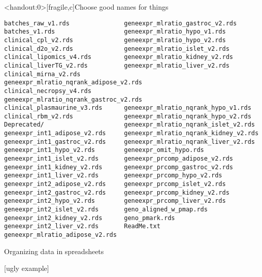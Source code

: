\documentclass[aspectratio=169,12pt,t]{beamer}
\begin{document}
\begin{frame}<handout:0>[fragile,c]{Choose good names for things}


\begin{center}
\begin{minipage}[c]{9.5cm}
\begin{semiverbatim}
\lstset{basicstyle=\tiny}
\begin{lstlisting}[escapechar=!,linewidth=9.5cm]
batches_raw_v1.rds               geneexpr_mlratio_gastroc_v2.rds
batches_v1.rds                   geneexpr_mlratio_hypo_v1.rds
clinical_cpl_v2.rds              geneexpr_mlratio_hypo_v2.rds
clinical_d2o_v2.rds              geneexpr_mlratio_islet_v2.rds
clinical_lipomics_v4.rds         geneexpr_mlratio_kidney_v2.rds
clinical_liverTG_v2.rds          geneexpr_mlratio_liver_v2.rds
clinical_mirna_v2.rds            geneexpr_mlratio_nqrank_adipose_v2.rds
clinical_necropsy_v4.rds         geneexpr_mlratio_nqrank_gastroc_v2.rds
clinical_plasmaurine_v3.rds      geneexpr_mlratio_nqrank_hypo_v1.rds
clinical_rbm_v2.rds              geneexpr_mlratio_nqrank_hypo_v2.rds
Deprecated/                      geneexpr_mlratio_nqrank_islet_v2.rds
geneexpr_int1_adipose_v2.rds     geneexpr_mlratio_nqrank_kidney_v2.rds
geneexpr_int1_gastroc_v2.rds     geneexpr_mlratio_nqrank_liver_v2.rds
geneexpr_int1_hypo_v2.rds        geneexpr_omit_hypo.rds
geneexpr_int1_islet_v2.rds       geneexpr_prcomp_adipose_v2.rds
geneexpr_int1_kidney_v2.rds      geneexpr_prcomp_gastroc_v2.rds
geneexpr_int1_liver_v2.rds       geneexpr_prcomp_hypo_v2.rds
geneexpr_int2_adipose_v2.rds     geneexpr_prcomp_islet_v2.rds
geneexpr_int2_gastroc_v2.rds     geneexpr_prcomp_kidney_v2.rds
geneexpr_int2_hypo_v2.rds        geneexpr_prcomp_liver_v2.rds
geneexpr_int2_islet_v2.rds       geno_aligned_w_pmap.rds
geneexpr_int2_kidney_v2.rds      geno_pmark.rds
geneexpr_int2_liver_v2.rds       ReadMe.txt
geneexpr_mlratio_adipose_v2.rds
\end{lstlisting}
\end{semiverbatim}
\end{minipage}
\end{center}


\end{frame}




\begin{frame}[c]{Organizing data in spreadsheets}


  [ugly example]

  \note{}
\end{frame}
\end{document}
